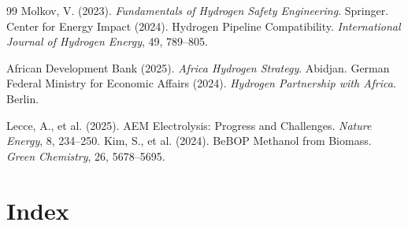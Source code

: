 \documentclass[12pt,twoside,openany]{book}
\begin{document}
\begin{thebibliography}{99}
 Molkov, V. (2023). \textit{Fundamentals of Hydrogen Safety Engineering}.
                     Springer.
    Center for Energy Impact (2024). Hydrogen Pipeline Compatibility.
                     \textit{International Journal of Hydrogen Energy}, 49, 789--805.

 African Development Bank (2025). \textit{Africa Hydrogen Strategy}.
                     Abidjan.
 German Federal Ministry for Economic Affairs (2024).
                     \textit{Hydrogen Partnership with Africa}. Berlin.

  Lecce, A., et al. (2025). AEM Electrolysis: Progress and Challenges.
                     \textit{Nature Energy}, 8, 234--250.
    Kim, S., et al. (2024). BeBOP Methanol from Biomass.
                     \textit{Green Chemistry}, 26, 5678--5695.
\end{thebibliography}

\chapter*{Index}
\printindex
\end{document}
